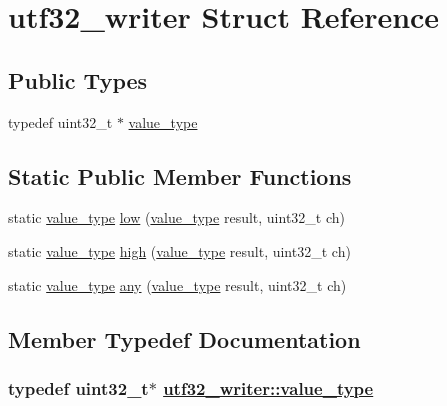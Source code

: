 \hypertarget{structutf32__writer}{
\section{utf32\_\-writer Struct Reference}
\label{structutf32__writer}
}
\subsection*{Public Types}
\begin{CompactItemize}
\item 
typedef uint32\_\-t $\ast$ \hyperlink{structutf32__writer_2284e1fa3406f113f151ded2aaa8d4ae}{value\_\-type}
\end{CompactItemize}
\subsection*{Static Public Member Functions}
\begin{CompactItemize}
\item 
static \hyperlink{structutf32__writer_2284e1fa3406f113f151ded2aaa8d4ae}{value\_\-type} \hyperlink{structutf32__writer_06e1b65906f7355ea54a622248095bc7}{low} (\hyperlink{structutf32__writer_2284e1fa3406f113f151ded2aaa8d4ae}{value\_\-type} result, uint32\_\-t ch)
\item 
static \hyperlink{structutf32__writer_2284e1fa3406f113f151ded2aaa8d4ae}{value\_\-type} \hyperlink{structutf32__writer_3f86d996cde3ed7cab5c31930b67c9f1}{high} (\hyperlink{structutf32__writer_2284e1fa3406f113f151ded2aaa8d4ae}{value\_\-type} result, uint32\_\-t ch)
\item 
static \hyperlink{structutf32__writer_2284e1fa3406f113f151ded2aaa8d4ae}{value\_\-type} \hyperlink{structutf32__writer_a94aaa4a13e755942e7da70ea7700d3e}{any} (\hyperlink{structutf32__writer_2284e1fa3406f113f151ded2aaa8d4ae}{value\_\-type} result, uint32\_\-t ch)
\end{CompactItemize}


\subsection{Member Typedef Documentation}
\hypertarget{structutf32__writer_2284e1fa3406f113f151ded2aaa8d4ae}{
\subsubsection[value\_\-type]{\setlength{\rightskip}{0pt plus 5cm}typedef uint32\_\-t$\ast$ \hyperlink{structutf32__writer_2284e1fa3406f113f151ded2aaa8d4ae}{utf32\_\-writer::value\_\-type}}}
\label{structutf32__writer_2284e1fa3406f113f151ded2aaa8d4ae}




